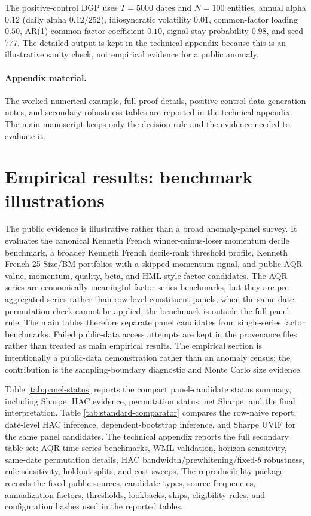 \documentclass[12pt,a4paper]{article}
\begin{document}
The positive-control DGP uses \(T=5000\) dates and \(N=100\) entities,
annual alpha \(0.12\) (daily alpha \(0.12/252\)), idiosyncratic
volatility \(0.01\), common-factor loading \(0.50\), AR(1) common-factor
coefficient \(0.10\), signal-stay probability \(0.98\), and seed 777.
The detailed output is kept in the technical appendix because this is an
illustrative sanity check, not empirical evidence for a public anomaly.

\paragraph{Appendix material.}
The worked numerical example, full proof details, positive-control data
generation notes, and secondary robustness tables are reported in the
technical appendix.  The main manuscript keeps only the decision rule
and the evidence needed to evaluate it.

\section{Empirical results: benchmark illustrations}
\label{sec:empirical}

The public evidence is illustrative rather than a broad anomaly-panel
survey.  It evaluates the canonical Kenneth French
winner-minus-loser momentum decile benchmark, a broader Kenneth French
decile-rank threshold profile, Kenneth French 25 Size/BM portfolios with
a skipped-momentum signal, and public AQR value, momentum, quality, beta,
and HML-style factor candidates.  The AQR series are economically meaningful
factor-series benchmarks, but they are pre-aggregated series rather than
row-level constituent panels; when the same-date permutation check cannot
be applied, the benchmark is outside the full panel rule.  The
main tables therefore separate panel candidates from single-series
factor benchmarks.  Failed public-data access attempts are kept in the
provenance files rather than treated as main empirical results.
The empirical section is intentionally a public-data demonstration rather
than an anomaly census; the contribution is the sampling-boundary
diagnostic and Monte Carlo size evidence.

Table \ref{tab:panel-status} reports the compact panel-candidate status
summary, including Sharpe, HAC evidence, permutation status, net Sharpe,
and the final interpretation.  Table \ref{tab:standard-comparator}
compares the row-naive report, date-level HAC inference,
dependent-bootstrap inference, and Sharpe UVIF for the same panel
candidates.  The technical appendix reports the full secondary table
set: AQR time-series benchmarks, WML validation, horizon sensitivity,
same-date permutation details, HAC bandwidth/prewhitening/fixed-\(b\)
robustness, rule sensitivity, holdout splits, and cost sweeps.
The reproducibility package records the fixed public sources, candidate
types, source frequencies, annualization factors, thresholds, lookbacks,
skips, eligibility rules, and configuration hashes used in the reported
tables.
\end{document}
